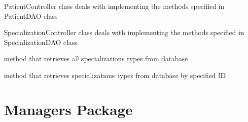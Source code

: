 \documentclass[letterpaper,10pt,english]{sphinxmanual}
\begin{document}

\begin{fulllineitems}
\label{controllers:doctors.controllers.PatientController}
PatientController class deals with implementing the methods specified in PatientDAO class

\end{fulllineitems}


\begin{fulllineitems}
\label{controllers:doctors.controllers.SpecializationController}
SpecializationController class deals with implementing the methods specified in SpecializationDAO class

\begin{fulllineitems}
\label{controllers:doctors.controllers.SpecializationController.getAll}
method that retrieves all specializations types from database

\end{fulllineitems}


\begin{fulllineitems}
\label{controllers:doctors.controllers.SpecializationController.getById}
method that retrieves specializations types from database by specified ID

\end{fulllineitems}


\end{fulllineitems}



\chapter{Managers Package}
\label{managers:module-doctors.managers}\label{managers:managers-package}\label{managers::doc}
\end{document}
